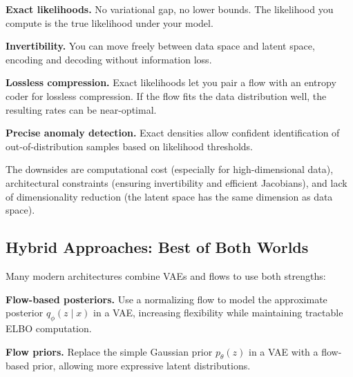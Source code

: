 \vspace{0.3cm}

\textbf{Exact likelihoods.} No variational gap, no lower bounds. The likelihood you compute is the true likelihood under your model.

\vspace{0.3cm}

\textbf{Invertibility.} You can move freely between data space and latent space, encoding and decoding without information loss.

\vspace{0.3cm}

\textbf{Lossless compression.} Exact likelihoods let you pair a flow with an entropy coder for lossless compression. If the flow fits the data distribution well, the resulting rates can be near-optimal.

\vspace{0.3cm}

\textbf{Precise anomaly detection.} Exact densities allow confident identification of out-of-distribution samples based on likelihood thresholds.

\vspace{0.3cm}

The downsides are computational cost (especially for high-dimensional data), architectural constraints (ensuring invertibility and efficient Jacobians), and lack of dimensionality reduction (the latent space has the same dimension as data space).

\vspace{1.5em}

\subsection{Hybrid Approaches: Best of Both Worlds}

Many modern architectures combine VAEs and flows to use both strengths:

\vspace{0.3cm}

\textbf{Flow-based posteriors.} Use a normalizing flow to model the approximate posterior $q_\phi(z \mid x)$ in a VAE, increasing flexibility while maintaining tractable ELBO computation.

\vspace{0.3cm}

\textbf{Flow priors.} Replace the simple Gaussian prior $p_\theta(z)$ in a VAE with a flow-based prior, allowing more expressive latent distributions.

